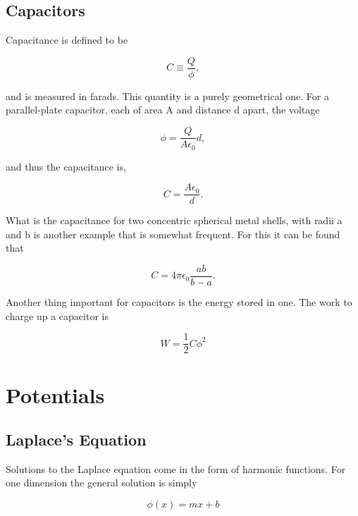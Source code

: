 \documentclass[preprint, review,12pt]{elsarticle}
\def\={\equiv}
\begin{document}
\subsection{Capacitors}

Capacitance is defined to be

\begin{equation}
    C \= \frac{Q}{\phi},
\end{equation}

and is measured in farads. This quantity is a purely geometrical one. For a parallel-plate capacitor, each of area A and distance d apart, the voltage

\begin{equation}
    \phi = \frac{Q}{A\epsilon_0}d,
\end{equation}

and thus the capacitance is,

\begin{equation}
    C = \frac{A\epsilon_0}{d}.
\end{equation}

What is the capacitance for two concentric spherical metal shells, with radii a and b is another example that is somewhat frequent. For this it can be found that

\begin{equation}
    C = 4\pi \epsilon_0 \frac{ab}{b-a}.
\end{equation}

Another thing important for capacitors is the energy stored in one. The work to charge up a capacitor is

\begin{equation}
    W = \frac{1}{2}C \phi^2
\end{equation}

\section{Potentials}

\subsection{Laplace's Equation}

Solutions to the Laplace equation come in the form of harmonic functions. For one dimension the general solution is simply

\begin{equation}
    \phi(x) = mx + b
\end{equation}
\end{document}
